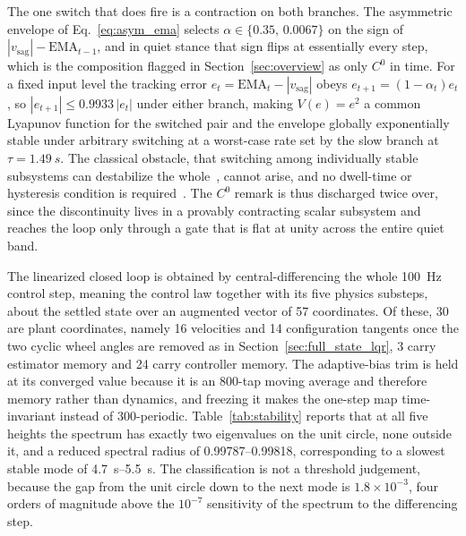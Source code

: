 \documentclass[a4paper,fleqn]{cas-dc}
\begin{document}
The one switch that does fire is a contraction on both branches. The asymmetric envelope of Eq.~\eqref{eq:asym_ema} selects $\alpha\in\{0.35,\,0.0067\}$ on the sign of $|v_{\text{sag}}|-\mathrm{EMA}_{t-1}$, and in quiet stance that sign flips at essentially every step, which is the composition flagged in Section~\ref{sec:overview} as only $C^0$ in time. For a fixed input level the tracking error $e_t=\mathrm{EMA}_t-|v_{\text{sag}}|$ obeys $e_{t+1}=(1-\alpha_t)e_t$, so $|e_{t+1}|\leq 0.9933\,|e_t|$ under either branch, making $V(e)=e^2$ a common Lyapunov function for the switched pair and the envelope globally exponentially stable under arbitrary switching at a worst-case rate set by the slow branch at $\tau{=}\SI{1.49}{s}$. The classical obstacle, that switching among individually stable subsystems can destabilize the whole~\cite{liberzon2003switching}, cannot arise, and no dwell-time or hysteresis condition is required~\cite{hespanha2003hysteresis}. The $C^0$ remark is thus discharged twice over, since the discontinuity lives in a provably contracting scalar subsystem and reaches the loop only through a gate that is flat at unity across the entire quiet band.

The linearized closed loop is obtained by central-differencing the whole \SI{100}{Hz} control step, meaning the control law together with its five physics substeps, about the settled state over an augmented vector of \num{57} coordinates. Of these, \num{30} are plant coordinates, namely \num{16} velocities and \num{14} configuration tangents once the two cyclic wheel angles are removed as in Section~\ref{sec:full_state_lqr}, \num{3} carry estimator memory and \num{24} carry controller memory. The adaptive-bias trim is held at its converged value because it is an \num{800}-tap moving average and therefore memory rather than dynamics, and freezing it makes the one-step map time-invariant instead of \num{300}-periodic. Table~\ref{tab:stability} reports that at all five heights the spectrum has exactly two eigenvalues on the unit circle, none outside it, and a reduced spectral radius of \numrange{0.99787}{0.99818}, corresponding to a slowest stable mode of \SIrange{4.7}{5.5}{s}. The classification is not a threshold judgement, because the gap from the unit circle down to the next mode is $1.8{\times}10^{-3}$, four orders of magnitude above the $10^{-7}$ sensitivity of the spectrum to the differencing step.
\end{document}
